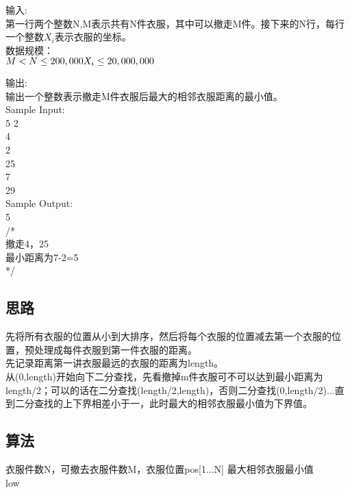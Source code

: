 \documentclass[UTF8]{ctexart}
\begin{document}
输入:\\
第一行两个整数N,M表示共有N件衣服，其中可以撤走M件。接下来的N行，每行一个整数$X_i$表示衣服的坐标。\\

数据规模：\\
$M<N\leq 200,000\\
X_i\leq 20,000,000$

输出:\\
输出一个整数表示撤走M件衣服后最大的相邻衣服距离的最小值。\\

Sample Input:\\
5 2\\
4\\
2\\
25\\
7\\
29\\


Sample Output:\\
5\\
/*\\
撤走4，25\\
最小距离为7-2=5\\
*/\\

\subsection{思路}
先将所有衣服的位置从小到大排序，然后将每个衣服的位置减去第一个衣服的位置，预处理成每件衣服到第一件衣服的距离。\\
先记录距离第一讲衣服最远的衣服的距离为length。\\
从(0,length)开始向下二分查找，先看撤掉m件衣服可不可以达到最小距离为length/2；可以的话在二分查找(length/2,length)，否则二分查找(0,length/2)...直到二分查找的上下界相差小于一，此时最大的相邻衣服最小值为下界值。

\subsection{算法}

\renewcommand{\algorithmicrequire}{\textbf{输入:}}
\renewcommand{\algorithmicensure}{\textbf{输出:}}
\begin{algorithm}
	\caption{}
	\begin{algorithmic}[1]
	\Require 衣服件数N，可撤去衣服件数M，衣服位置pos[1...N]
	\Ensure 最大相邻衣服最小值
	\EndFor
		\Else
		\EndIf
	\EndWhile\\
	\Return low
	\end{algorithmic}
\end{algorithm}
\end{document}
